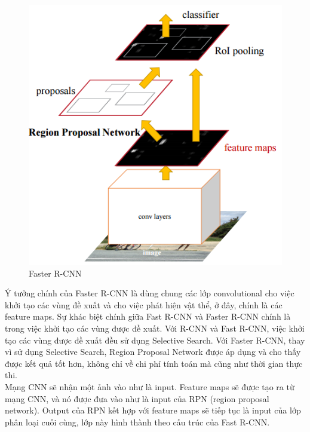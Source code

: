 \begin{center}
   \begin{figure}[H]
   \begin{center}
     \includegraphics[scale=0.6]{image/faster_rcnn_1}
    \end{center}
    \caption{Faster R-CNN}
    \label{faster_rcnn}
    \end{figure}
\end{center}

Ý tưởng chính của Faster R-CNN là dùng chung các lớp convolutional cho việc khởi tạo các vùng đề xuất và cho việc phát hiện vật thể, ở đây, chính là các feature maps. Sự khác biệt chính giữa Fast R-CNN và Faster R-CNN chính là trong việc khởi tạo các vùng được đề xuất. Với R-CNN và Fast R-CNN, việc khởi tạo các vùng được đề xuất đều sử dụng Selective Search. Với Faster R-CNN, thay vì sử dụng Selective Search, Region Proposal Network được áp dụng và cho thấy được kết quả tốt hơn, không chỉ về chi phí tính toán mà cũng như thời gian thực thi. \\

Mạng CNN sẽ nhận một ảnh vào như là input. Feature maps sẽ được tạo ra từ mạng CNN, và nó được đưa vào như là input của RPN (region proposal network). Output của RPN kết hợp với feature maps sẽ tiếp tục là input của lớp phân loại cuối cùng, lớp này hình thành theo cấu trúc của Fast R-CNN. \\

